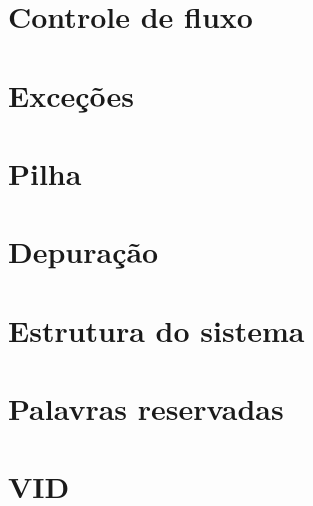 \documentclass[12pt,a4paper]{article}
\begin{document}
\section{Controle de fluxo}
\section{Exceções}
\section{Pilha}
\section{Depuração}
\section{Estrutura do sistema}
\section{Palavras reservadas}
\section{VID}
\end{document}
